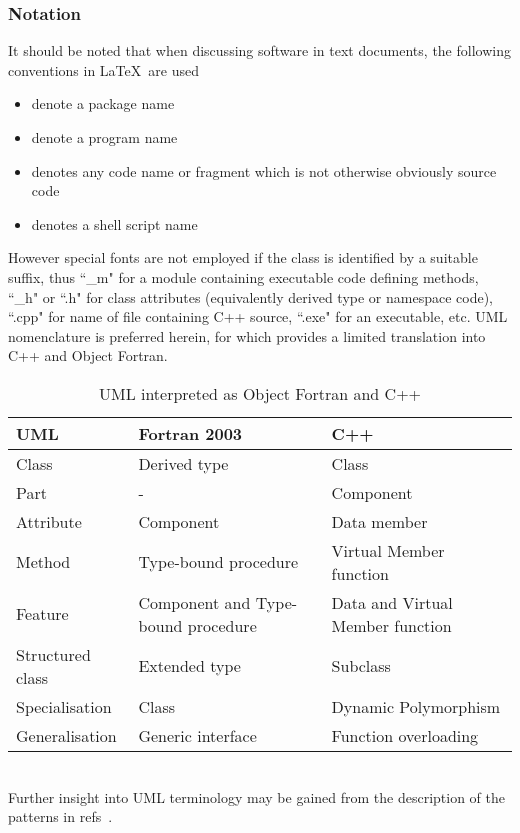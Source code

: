 \subsubsection{Notation}

It should be noted that when discussing software in text documents,
the following conventions in \LaTeX\  are used
\begin{itemize}
\item {} denote a package name
\item {} denote a program name
\item {} denotes any code name or fragment which is not otherwise obviously source code
\item {} denotes a shell script name
\end{itemize}
However special fonts are not employed if the class is identified by a
suitable suffix, thus ``\_m" for a module containing executable code defining methods,
``\_h" or ``.h" for class attributes (equivalently derived type or namespace code), ``.cpp" for name of file containing 
C++ source, ``.exe" for an executable, etc.
UML nomenclature
is preferred herein, for which  provides a limited 
translation into C++ and Object Fortran. %

\begin{table}[tbph]
\begin{center}
\caption{UML interpreted as Object Fortran and C++ \label{tab:umltrans}}
\begin{tabular}{|p{5cm}|p{5cm}|p{5cm}|}
\hline
UML & Fortran 2003 & C++  \\
\hline
Class & Derived type & Class \\
Part  &  - & Component  \\
Attribute & Component & Data member \\
Method & Type-bound procedure & Virtual Member function \\
Feature  & Component and Type-bound procedure & Data and Virtual Member function \\
Structured class & Extended type & Subclass  \\
Specialisation & Class & Dynamic Polymorphism \\
Generalisation & Generic interface & Function overloading \\
\hline
\end{tabular}\\[2ex]
Further insight into UML terminology may be gained from the description
of the patterns in refs~\cite{y2re332,y2re333}.
\end{center}
\end{table}


